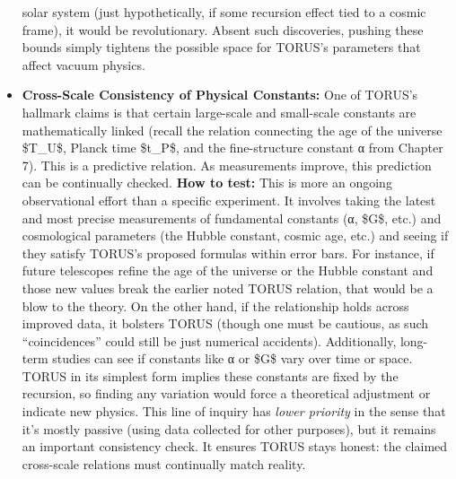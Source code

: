 \documentclass[
]{article}
\begin{document}
\begin{itemize}
  solar system (just hypothetically, if some recursion effect tied to a
  cosmic frame), it would be revolutionary. Absent such discoveries,
  pushing these bounds simply tightens the possible space for TORUS's
  parameters that affect vacuum physics.
\item
  \textbf{Cross-Scale Consistency of Physical Constants:} One of TORUS's
  hallmark claims is that certain large-scale and small-scale constants
  are mathematically linked (recall the relation connecting the age of
  the universe \$T\_U\$, Planck time \$t\_P\$, and the fine-structure
  constant α from Chapter 7). This is a predictive relation. As
  measurements improve, this prediction can be continually checked.
  \textbf{How to test:} This is more an ongoing observational effort
  than a specific experiment. It involves taking the latest and most
  precise measurements of fundamental constants (α, \$G\$, etc.) and
  cosmological parameters (the Hubble constant, cosmic age, etc.) and
  seeing if they satisfy TORUS's proposed formulas within error
  bars\hspace{0pt}. For instance, if future telescopes refine the age of
  the universe or the Hubble constant and those new values break the
  earlier noted TORUS relation, that would be a blow to the theory. On
  the other hand, if the relationship holds across improved data, it
  bolsters TORUS (though one must be cautious, as such ``coincidences''
  could still be just numerical accidents). Additionally, long-term
  studies can see if constants like α or \$G\$ vary over time or space.
  TORUS in its simplest form implies these constants are fixed by the
  recursion, so finding any variation would force a theoretical
  adjustment or indicate new physics. This line of inquiry has
  \emph{lower priority} in the sense that it's mostly passive (using
  data collected for other purposes)\hspace{0pt}, but it remains an
  important consistency check. It ensures TORUS stays honest: the
  claimed cross-scale relations must continually match reality.
\end{itemize}
\end{document}
